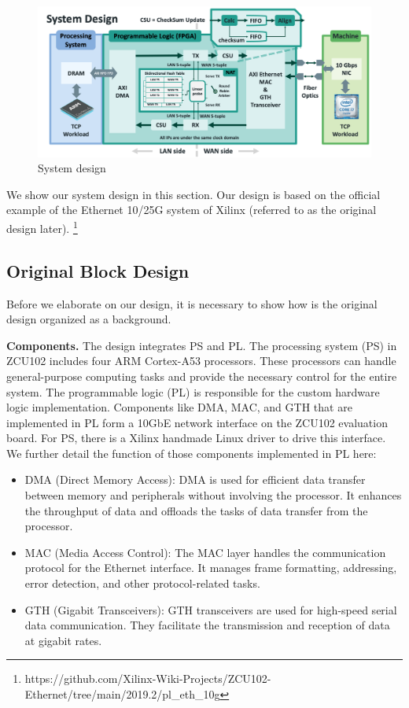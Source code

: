 \begin{figure}[h]
    \centering
    \includegraphics[width=\linewidth]{images/design.png}
    \caption{System design}
\end{figure}
    We show our system design in this section. Our design is based on the official example of the Ethernet 10/25G system of Xilinx (referred to as the original design later). \footnote{https://github.com/Xilinx-Wiki-Projects/ZCU102-Ethernet/tree/main/2019.2/pl\_eth\_10g}

\subsection{Original Block Design}
    Before we elaborate on our design, it is necessary to show how is the original design organized as a background.

    \textbf{Components.} The design integrates PS and PL. The processing system (PS) in ZCU102 includes four ARM Cortex-A53 processors. These processors can handle general-purpose computing tasks and provide the necessary control for the entire system. The programmable logic (PL) is responsible for the custom hardware logic implementation. 
    Components like DMA, MAC, and GTH that are implemented in PL form a 10GbE network interface on the ZCU102 evaluation board. For PS, there is a Xilinx handmade Linux driver to drive this interface. We further detail the function of those components implemented in PL here:

    \begin{itemize}
    \item {DMA (Direct Memory Access)}: DMA is used for efficient data transfer between memory and peripherals without involving the processor. It enhances the throughput of data and offloads the tasks of data transfer from the processor.
    \item {MAC (Media Access Control)}: The MAC layer handles the communication protocol for the Ethernet interface. It manages frame formatting, addressing, error detection, and other protocol-related tasks.
    \item {GTH (Gigabit Transceivers)}: GTH transceivers are used for high-speed serial data communication. They facilitate the transmission and reception of data at gigabit rates.
    \end{itemize}


